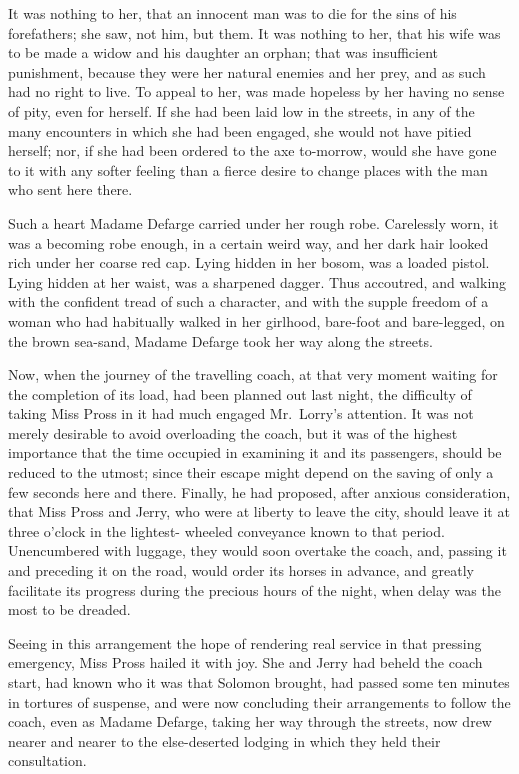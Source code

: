 It was nothing to her, that an innocent man was to die for the sins
of his forefathers; she saw, not him, but them.  It was nothing to her,
that his wife was to be made a widow and his daughter an orphan; that
was insufficient punishment, because they were her natural enemies
and her prey, and as such had no right to live.  To appeal to her,
was made hopeless by her having no sense of pity, even for herself.
If she had been laid low in the streets, in any of the many encounters
in which she had been engaged, she would not have pitied herself;
nor, if she had been ordered to the axe to-morrow, would she have
gone to it with any softer feeling than a fierce desire to change
places with the man who sent here there.

Such a heart Madame Defarge carried under her rough robe.  Carelessly
worn, it was a becoming robe enough, in a certain weird way, and her
dark hair looked rich under her coarse red cap.  Lying hidden in her
bosom, was a loaded pistol.  Lying hidden at her waist, was a sharpened
dagger.  Thus accoutred, and walking with the confident tread of such
a character, and with the supple freedom of a woman who had habitually
walked in her girlhood, bare-foot and bare-legged, on the brown
sea-sand, Madame Defarge took her way along the streets.

Now, when the journey of the travelling coach, at that very moment
waiting for the completion of its load, had been planned out last
night, the difficulty of taking Miss Pross in it had much engaged
Mr.\ Lorry's attention.  It was not merely desirable to avoid
overloading the coach, but it was of the highest importance that the
time occupied in examining it and its passengers, should be reduced
to the utmost; since their escape might depend on the saving of only
a few seconds here and there.  Finally, he had proposed, after anxious
consideration, that Miss Pross and Jerry, who were at liberty to
leave the city, should leave it at three o'clock in the lightest-%
wheeled conveyance known to that period.  Unencumbered with luggage,
they would soon overtake the coach, and, passing it and preceding it
on the road, would order its horses in advance, and greatly facilitate
its progress during the precious hours of the night, when delay was
the most to be dreaded.

Seeing in this arrangement the hope of rendering real service in that
pressing emergency, Miss Pross hailed it with joy.  She and Jerry had
beheld the coach start, had known who it was that Solomon brought,
had passed some ten minutes in tortures of suspense, and were now
concluding their arrangements to follow the coach, even as Madame
Defarge, taking her way through the streets, now drew nearer and
nearer to the else-deserted lodging in which they held their consultation.


